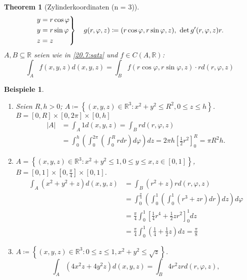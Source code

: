 \documentclass[12pt]{extreport} %
\newcommand{\R}{\mathbb{R}}
\theoremstyle{named}
\newtheorem{unnamedtheorem}{Theorem} \counterwithin{unnamedtheorem}{chapter}
\theoremstyle{nnamed}
\theoremstyle{itshape}
\theoremstyle{normal}
\newtheorem*{beispiele}{Beispiele}
\begin{document}
\begin{unnamedtheorem}[Zylinderkoordinaten (n = 3)] \label{20.9:satz}
	$$ \begin{rcases} y = r \cos \varphi \\ y = r \sin \varphi \\ z = z \end{rcases} \quad g(r,\varphi, z ) \coloneqq (r \cos \varphi, r \sin \varphi, z), ~ \det g'(r, \varphi, z ) r. $$
	$A, B \subseteq \R$ seien wie in \ref{20.7:satz} und $f \in C(A, \R)$:
		$$ \int_{A} f(x,y,z) d(x,y,z) = \int_{B} f(r \cos \varphi, r \sin \varphi, z) \cdot r d(r, \varphi, z) $$
\end{unnamedtheorem}


\begin{beispiele} ~\
	\begin{enumerate}
		\item Seien $R, h > 0$; $A \coloneqq \left\{ (x,y,z) \in \R^{3} \colon x^{2} + y^{2} \leq R^{2}, 0 \leq z \leq h \right\}$. $B = [0, R] \times [0, 2\pi] \times [0, h]$
		\begin{align*} %
			|A| & = \int_{A} 1 d(x,y,z) = \int_{B} r d(r,\varphi, z) \\
				& = \int_{0}^{h} \left( \int_{0}^{2\pi} \left( \int_{0}^{R} r dr \right) d\varphi \right) dz = 2 \pi h \left[ \frac{1}{2} r^{2} \right]_{0}^{R} = \pi R^{2} h.
		\end{align*} 
		\item $A = \left\{ (x,y,z) \in \R^{3} \colon x^{2} + y^{2} \leq 1, 0 \leq y \leq x, z \in [0,1] \right\}$, $B = [0, 1] \times [0, \frac{\pi}{4}] \times [0,1]$.
			\begin{align*} %
				\int_{A} \left( x^{2} + y^{2} + z \right) d(x,y,z) & = \int_{B} \left( r^{2} + z \right) r d(r, \varphi, z) \\
					& = \int_{0}^{\frac{\pi}{4}} \left( \int_{0}^{1} \left( \int_{0}^{1} \left( r^{3} + zr \right) dr \right) dz \right) d\varphi \\
					& = \frac{\pi}{4} \int_{0}^{1} \left[ \frac{1}{4} r^{4} + \frac{1}{2} z r^{2} \right]_{0}^{1} dz \\
					& = \frac{\pi}{4} \int_{0}^{1} \left( \frac{1}{4} + \frac{1}{2} z \right) dz = \frac{\pi}{8}
			\end{align*}
		\item $A \coloneqq \left\{ (x,y,z) \in \R^{3} \colon 0 \leq z \leq 1, x^{2} + y^{2} \leq \sqrt{z} \right\}$.
			$$ \int_{A} \left( 4 x^{2} z + 4 y^{2} z \right) d(x,y,z) = \int_{B} 4 r^{2} z r d(r,\varphi, z), $$

\end{enumerate}
\end{beispiele}
\end{document}
